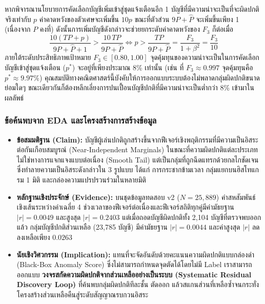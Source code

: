 หากพิจารณานโยบายการคัดเลือกบัญชีเพิ่มเข้าสู่ชุดแจ้งเตือนอีก 1 บัญชีที่มีความน่าจะเป็นที่จะผิดปกติจริงเท่ากับ $p$ ค่าคาดหวังของตัวเศษจะเพิ่มขึ้น $10p$ ขณะที่ตัวส่วน $9P + \hat{P}$ จะเพิ่มขึ้นเพียง 1 (เนื่องจาก $P$ คงที่) ดังนั้นการเพิ่มบัญชีดังกล่าวจะช่วยยกระดับค่าคาดหวังของ $F_3$ ก็ต่อเมื่อ
\begin{equation}
\frac{10(TP + p)}{9P + \hat{P} + 1} > \frac{10\,TP}{9P + \hat{P}} \iff p > \frac{TP}{9P + \hat{P}} = \frac{F_3}{1 + \beta^2} = \frac{F_3}{10}
\label{eq:t5_breakeven}
\end{equation}
ภายใต้ระดับประสิทธิภาพเป้าหมาย $F_3 \in [0.80, 1.00]$ จุดคุ้มทุนของความน่าจะเป็นในการคัดเลือกบัญชีเข้าสู่ชุดแจ้งเตือน ($p^*$) จะอยู่ที่เพียงประมาณ 8\% เท่านั้น (เช่น ที่ $F_3 \approx 0.997$ จุดคุ้มทุนคือ $p^* \approx 9.97\%$) คุณสมบัติทางคณิตศาสตร์นี้บังคับให้การออกแบบระบบต้องไม่พลาดกลุ่มผิดปกติขนาดย่อมใดๆ ขณะเดียวกันก็ต้องหลีกเลี่ยงการปนเปื้อนบัญชีปกติที่มีความน่าจะเป็นต่ำกว่า 8\% เข้ามาในผลลัพธ์

\subsubsection{ข้อค้นพบจาก EDA และโครงสร้างการสร้างข้อมูล}
\label{subsubsec:t5_eda}

\begin{insightbox}
\begin{itemize}
  \item \textbf{ข้อสมมติฐาน (Claim):} บัญชีผู้เล่นปกติถูกสร้างขึ้นจากฟีเจอร์เชิงพฤติกรรมที่มีความเป็นอิสระต่อกันเกือบสมบูรณ์ (Near-Independent Marginals) ในขณะที่ความผิดปกติแต่ละประเภทไม่ใช่หางการแจกแจงแบบต่อเนื่อง (Smooth Tail) แต่เป็นกลุ่มที่ถูกฉีดแทรกด้วยกลไกชัดเจนซึ่งทำลายความเป็นอิสระดังกล่าวใน 3 รูปแบบ ได้แก่ การกระชากข้ามเวลา กลุ่มแยกบนฮิสโทแกรม 1 มิติ และกล่องความแปรปรวนร่วมในหลายมิติ
  \item \textbf{หลักฐานเชิงประจักษ์ (Evidence):} บนชุดข้อมูลทดสอบ v2 ($N = 25{,}889$) ค่าสหสัมพันธ์เชิงเส้นระหว่างค่าเฉลี่ย 4 ช่วงเวลาของฟีเจอร์ต่อเนื่องและฟีเจอร์สถิติทุกคู่มีค่ามัธยฐาน $|r| = 0.0049$ และสูงสุด $|r| = 0.2403$ แต่เมื่อถอดบัญชีผิดปกติทั้ง 2,104 บัญชีที่ตรวจพบออกแล้ว กลุ่มบัญชีปกติส่วนเหลือ (23,785 บัญชี) มีค่ามัธยฐาน $|r| = 0.0044$ และค่าสูงสุด $|r|$ ลดลงเหลือเพียง $0.0263$
  \item \textbf{นัยเชิงวิศวกรรม (Implication):} แทนที่จะจัดอันดับด้วยคะแนนความผิดปกติแบบกล่องดำ (Black-Box Anomaly Score) ซึ่งไม่สามารถกำหนดจุดตัดได้โดยไม่มี Label เราสามารถออกแบบ \textbf{วงจรสกัดความผิดปกติจากส่วนเหลืออย่างเป็นระบบ (Systematic Residual Discovery Loop)} ที่ค้นพบกลุ่มผิดปกติทีละชั้น ตัดออก แล้วสแกนส่วนที่เหลือซ้ำจนกระทั่งโครงสร้างส่วนเหลือคืนสู่ระดับสัญญาณรบกวนอิสระ
\end{itemize}
\end{insightbox}

